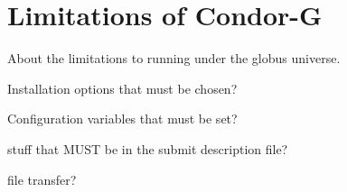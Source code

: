 \section{\label{sec:Condor-G-Limits}Limitations of Condor-G}

About the limitations to running under the globus universe.

Installation options that must be chosen?

Configuration variables that must be set?

stuff that MUST be in the submit description file?

file transfer?

